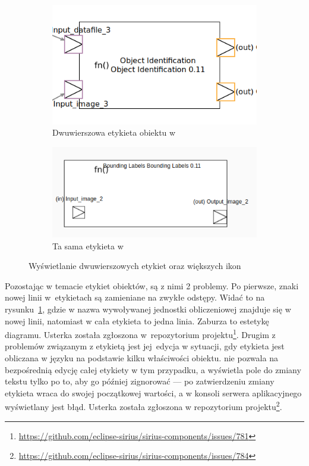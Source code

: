 \begin{figure}[h]
	\centering
	\begin{subfigure}{.49\textwidth}
		\centering
    \includegraphics[width=.8\linewidth]{./images/sirius-desktop-multiline-label.png}
		\caption{Dwuwierszowa etykieta obiektu w \SiriusDesktop{}}
	\end{subfigure}
	\begin{subfigure}{.49\textwidth}
		\centering
		\includegraphics[width=.99\linewidth]{./images/sirius-web-multiline-label.png}
		\caption{Ta sama etykieta w \SiriusWeb{}}
	\end{subfigure}

    \caption{Wyświetlanie dwuwierszowych
      etykiet oraz większych ikon}\label{rys:sirius-multiline-labels}
\end{figure}

Pozostając w temacie etykiet obiektów, są z nimi 2 problemy. Po pierwsze,
znaki nowej linii w~etykietach są zamieniane na zwykłe odstępy. Widać to na
rysunku~\ref{rys:sirius-multiline-labels}, gdzie w \SiriusDesktop{} nazwa
wywoływanej jednostki
obliczeniowej znajduje się w nowej linii, natomiast w \SiriusWeb{} cała
etykieta to jedna linia. Zaburza to estetykę diagramu. Usterka została
zgłoszona w~repozytorium projektu\footnote{
	\url{https://github.com/eclipse-sirius/sirius-components/issues/781}
}. Drugim z problemów związanym z etykietą jest jej~edycja w sytuacji, gdy
etykieta jest obliczana w języku \AQL{} na podstawie kilku właściwości
obiektu. \SiriusDesktop{} nie pozwala na bezpośrednią edycję całej
etykiety w tym przypadku, a \SiriusWeb{} wyświetla pole do zmiany tekstu
tylko po to, aby go później zignorować --- po zatwierdzeniu zmiany etykieta
wraca do swojej początkowej wartości, a w konsoli serwera aplikacyjnego
wyświetlany jest błąd. Usterka została zgłoszona w repozytorium
projektu\footnote{
	\url{https://github.com/eclipse-sirius/sirius-components/issues/784}
}.

